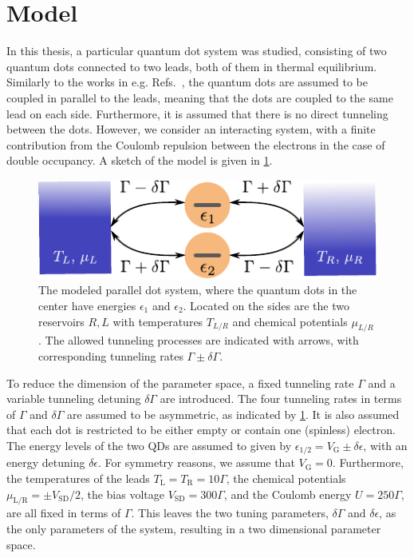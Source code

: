 \documentclass[../main.tex]{subfiles}
\begin{document}
\section{Model}
In this thesis, a particular quantum dot system was studied, consisting of two quantum dots connected to two leads, both of them in thermal equilibrium. Similarly to the works in e.g. Refs.~\cite{doubledot,doubledot2}, the quantum dots are assumed to be coupled in parallel to the leads, meaning that the dots are coupled to the same lead on each side. Furthermore, it is assumed that there is no direct tunneling between the dots. However, we consider an interacting system, with a finite contribution from the Coulomb repulsion between the electrons in the case of double occupancy. A sketch of the model is given in \cref{fig:model}.
\begin{figure}[H] \centering
    \includegraphics[width=0.8\linewidth]{figures/model.pdf}
    \caption{The modeled parallel dot system, where the quantum dots in the center have energies $\epsilon_1$ and $\epsilon_2$. Located on the sides are the two reservoirs $R,L$ with temperatures $T_{L/R}$ and chemical potentials $\mu_{L/R}$. The allowed tunneling processes are indicated with arrows, with corresponding tunneling rates $\Gamma \pm \delta\Gamma$.}
    \label{fig:model}
\end{figure}
To reduce the dimension of the parameter space, a fixed tunneling rate $\Gamma$ and a variable tunneling detuning $\delta\Gamma$ are introduced. The four tunneling rates in terms of $\Gamma$ and $\delta\Gamma$ are assumed to be asymmetric, as indicated by \cref{fig:model}. It is also assumed that each dot is restricted to be either empty or contain one (spinless) electron. The energy levels of the two QDs are assumed to given by $\epsilon_{1/2} = V_\text{G} \pm \delta\epsilon$, with an energy detuning $\delta\epsilon$. For symmetry reasons, we assume that $V_\text{G} = 0$. Furthermore, the temperatures of the leads $T_\text{L}=T_\text{R}=10\Gamma$, the chemical potentials $\mu_\text{L/R} = \pm V_\text{SD}/2$, the bias voltage $V_\text{SD} = 300\Gamma$, and the Coulomb energy $U = 250\Gamma$, are all fixed in terms of $\Gamma$. This leaves the two tuning parameters, $\delta\Gamma$ and $\delta\epsilon$, as the only parameters of the system, resulting in a two dimensional parameter space. 
\end{document}
